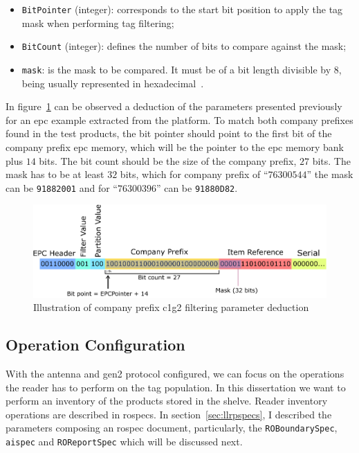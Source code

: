 \begin{itemize}
  \item \texttt{BitPointer} (integer): corresponds to the start bit position to apply the tag mask when performing tag filtering;
  \item \texttt{BitCount} (integer): defines the number of bits to compare against the mask;
  \item \texttt{mask}: is the mask to be compared. It must be of a bit length divisible by $8$, being usually represented in hexadecimal~\cite{LowLevelReader}.
\end{itemize}

In figure~\ref{fig:c1g2filter} can be observed a deduction of the parameters presented previously for an \ac{epc} example extracted from the platform.
To match both company prefixes found in the test products, the bit pointer should point to the first bit of the company prefix \ac{epc} memory, which will be the pointer to the \ac{epc} memory bank plus $14$ bits.
The bit count should be the size of the company prefix, $27$ bits. The mask has to be at least $32$ bits, which for company prefix of ``$76300544$'' the mask can be \texttt{91882001} and for ``$76300396$'' can be \texttt{91880D82}.

\begin{figure}
  \centering
  \includegraphics[width=\textwidth]{figs/c1g2filter.eps}
  \caption{Illustration of company prefix \ac{c1g2} filtering parameter deduction}
  \label{fig:c1g2filter}
\end{figure}

\subsection{Operation Configuration}

With the antenna and \ac{gen2} protocol configured, we can focus on the operations the reader has to perform on the tag population.
In this dissertation we want to perform an inventory of the products stored in the shelve. Reader inventory operations are described in \acp{rospec}.
In section~\ref{sec:llrpspecs}, I described the parameters composing an \ac{rospec} document, particularly, the \texttt{ROBoundarySpec}, \texttt{\acs{aispec}} and \texttt{ROReportSpec} which will be discussed next.

